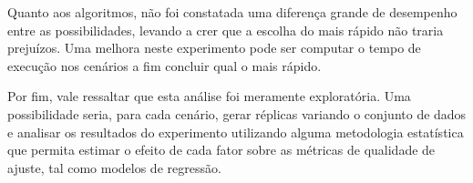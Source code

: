 \documentclass[
	12pt,				%
	openright,			%
	twoside,			%
	a4paper,			%
	english,			%
	brazil,				%
	svgnames
	]{abntex2}\usepackage[]{graphicx}\usepackage[]{color}
\begin{document}
Quanto aos algoritmos, não foi constatada uma diferença grande de desempenho entre as possibilidades, levando a crer que a escolha do mais rápido não traria prejuízos. Uma melhora neste experimento pode ser computar o tempo de execução nos cenários a fim concluir qual o mais rápido.

Por fim, vale ressaltar que esta análise foi meramente exploratória. Uma possibilidade seria, para cada cenário, gerar réplicas variando o conjunto de dados e analisar os resultados do experimento utilizando alguma metodologia estatística que permita estimar o efeito de cada fator sobre as métricas de qualidade de ajuste, tal como modelos de regressão.



\postextual




% 








\end{document}
